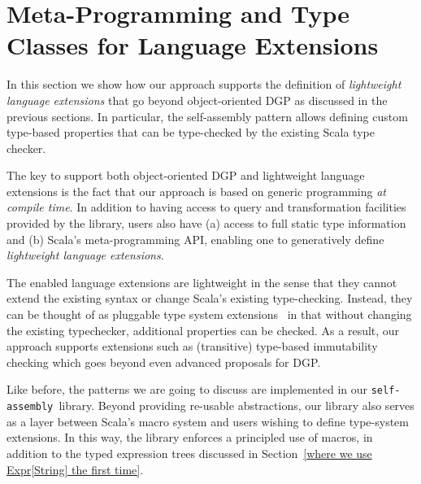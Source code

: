 \documentclass[preprint]{sigplanconf}
\newcommand{\selfassembly}{\texttt{self-assembly~}}
\begin{document}
\section{Meta-Programming and Type Classes for Language Extensions}
\label{sec:language-extensions}

In this section we show how our approach supports the definition of {\em
lightweight language extensions} that go beyond object-oriented DGP as
discussed in the previous sections. In particular, the self-assembly pattern
allows defining custom type-based properties that can be type-checked by the
existing Scala type checker.


The key to support both object-oriented DGP and lightweight language
extensions is the fact that our approach is based on generic programming {\em
at compile time}. In addition to having access to query and transformation
facilities provided by the library, users also have (a) access to full static
type information and (b) Scala's meta-programming API, enabling one to
generatively define {\em lightweight language extensions}.

The enabled language extensions are lightweight in the sense that they cannot
extend the existing syntax or change Scala’s existing type-checking. Instead,
they can be thought of as pluggable type system
extensions~\cite{PluggableTypes} in that without changing the existing
typechecker, additional properties can be checked. As a result, our approach
supports extensions such as (transitive) type-based immutability checking
which goes beyond even advanced proposals for DGP.




Like before, the patterns we are going to discuss are implemented in our \selfassembly library. Beyond providing re-usable abstractions, our library also serves as a layer between Scala’s macro system and users wishing to define type-system extensions. In this way, the library enforces a principled use of macros, in addition to the typed expression trees discussed in Section~\ref{where we use Expr[String] the first time}.
\end{document}
